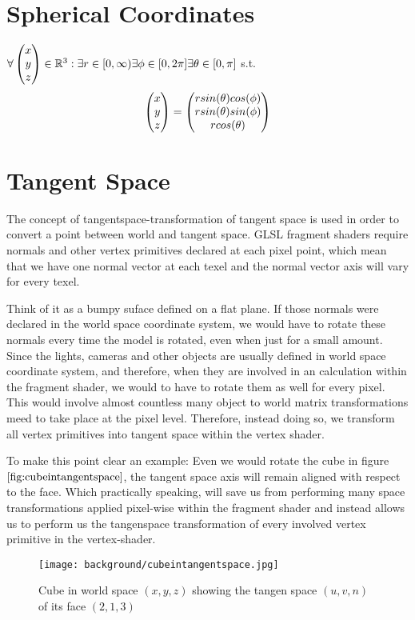 \section{Spherical Coordinates}
\label{sec:sphericalcoordinates}
$\forall \colvec[x]{y}{z} \in \mathbb{R}^3 : \exists r \in [0,\infty) \exists \phi \in [0,2\pi] \exists \theta \in [0,\pi] $ s.t.
\begin{equation*}
\colvec[x]{y}{z} = \colvec[r sin(\theta)cos(\phi)]{r sin(\theta)sin(\phi)}{r cos(\theta)}
\label{eq:sphericalcoordinates}
\end{equation*}


\section{Tangent Space}
\label{sec:tangentspace}
The concept of tangentspace-transformation of tangent space is used in order to convert a point between world and tangent space. GLSL fragment shaders require normals and other vertex primitives declared at each pixel point, which mean that we have one normal vector at each texel and the normal vector axis will vary for every texel. 

Think of it as a bumpy suface defined on a flat plane. If those normals were declared in the world space coordinate system, we would have to rotate these normals every time the model is rotated, even when just for a small amount. Since the lights, cameras and other objects are usually defined in world space coordinate system, and therefore, when they are involved in an calculation within the fragment shader, we would to have to rotate them as well for every pixel. This would involve almost countless many object to world matrix transformations meed to take place at the pixel level. Therefore, instead doing so, we transform all vertex primitives into tangent space within the vertex shader. 

To make this point clear an example: Even we would rotate the cube in figure $\ref{fig:cubeintangentspace}$, the tangent space axis will remain aligned with respect to the face. Which practically speaking, will save us from performing many space transformations applied pixel-wise within the fragment shader and instead allows us to perform us the tangenspace transformation of every involved vertex primitive in the vertex-shader.

\begin{figure}[H]
  \centering
  \texttt{[image: background/cubeintangentspace.jpg]}
  \caption[Illustration of a Tangent Space]{Cube in world space $(x,y,z)$ showing the tangen space $(u,v,n)$ of its face $(2,1,3)$}
  \label{fig:cubeintangentspace}
\end{figure}






